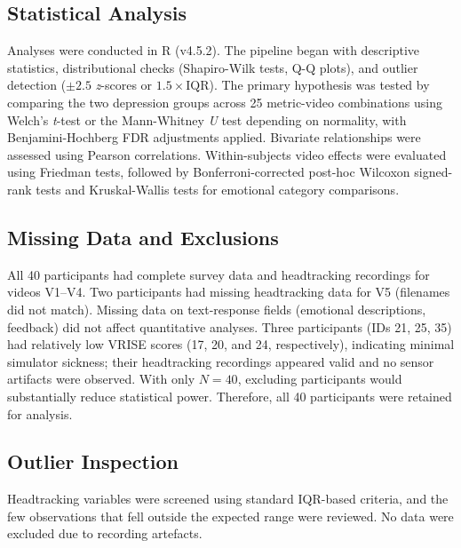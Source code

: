 \documentclass[12pt]{article}
\begin{document}
\subsection{Statistical Analysis}
Analyses were conducted in R (v4.5.2). The pipeline began with descriptive statistics, distributional checks (Shapiro-Wilk tests, Q-Q plots), and outlier detection ($\pm 2.5$ \emph{z}-scores or $1.5 \times \text{IQR}$). The primary hypothesis was tested by comparing the two depression groups across 25 metric-video combinations using Welch's \emph{t}-test or the Mann-Whitney \emph{U} test depending on normality, with Benjamini-Hochberg FDR adjustments applied. Bivariate relationships were assessed using Pearson correlations. Within-subjects video effects were evaluated using Friedman tests, followed by Bonferroni-corrected post-hoc Wilcoxon signed-rank tests and Kruskal-Wallis tests for emotional category comparisons.



\subsection{Missing Data and Exclusions}

All 40 participants had complete survey data and headtracking recordings for videos V1--V4. Two participants had missing headtracking data for V5 (filenames did not match). Missing data on text-response fields (emotional descriptions, feedback) did not affect quantitative analyses. Three participants (IDs 21, 25, 35) had relatively low VRISE scores (17, 20, and 24, respectively), indicating minimal simulator sickness; their headtracking recordings appeared valid and no sensor artifacts were observed. With only $N = 40$, excluding participants would substantially reduce statistical power. Therefore, all 40 participants were retained for analysis.

\subsection{Outlier Inspection}

Headtracking variables were screened using standard IQR-based criteria, and the few observations that fell outside the expected range were reviewed. No data were excluded due to recording artefacts.
\end{document}
